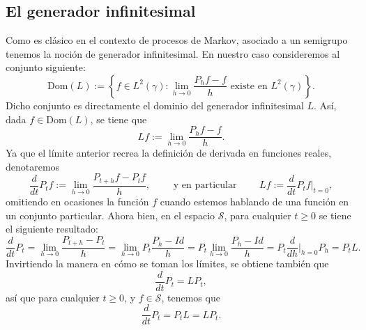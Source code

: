 \documentclass[letterpaper,twoside,12pt]{book}
\renewcommand{\S}{\mathcal{S}}
\newcommand{\1}{\mathds{1}}
\renewcommand{\to}{\rightarrow}
\theoremstyle{definition}
\theoremstyle{definition}
\theoremstyle{remark}
\theoremstyle{definition}
\theoremstyle{definition}
\theoremstyle{definition}
\theoremstyle{definition}
\theoremstyle{definition}
\begin{document}
\subsection{El generador infinitesimal}
 Como es clásico en el contexto de procesos de Markov, asociado a un semigrupo tenemos la noción de generador infinitesimal. En nuestro caso consideremos al conjunto siguiente:
 \[
 \text{Dom}(L):=\left\{f\in L^2(\gamma): \lim_{h\to 0} \frac{P_{h}f-f}{h} \text{ existe en } L^{2}(\gamma)\right\}.
 \]  
Dicho conjunto es directamente el dominio del generador infinitesimal $L$. Así, dada $f\in \text{Dom}(L)$, se tiene que 
\[
Lf:=\lim_{h\to 0}\frac{P_hf-f}{h}.    
\]
Ya que el límite anterior recrea la definición de derivada en funciones reales, denotaremos
\[
   \frac{d}{dt}P_tf:=\lim_{h\to0}\frac{P_{t+h}f-P_tf}{h}, \qquad \text{ y en particular } \qquad  Lf:=\frac{d}{dt}P_tf\bigg|_{t=0},
\]
omitiendo en ocasiones la función $f$ cuando estemos hablando de una función en un conjunto particular. Ahora bien, en el espacio $\S$, para cualquier $t\geq0$ se tiene el siguiente resultado:
\[
\frac{d}{dt}P_t=\lim_{h\to0}\frac{P_{t+h}-P_t}{h}=\lim_{h\to0}P_t\frac{P_h-Id}{h}=P_t\lim_{h\to0}\frac{P_h-Id}{h}=P_t\frac{d}{dh}\bigg|_{h=0}P_h=P_tL.
\]
Invirtiendo la manera en cómo se toman los límites, se obtiene también que
\[
\frac{d}{dt}P_t=LP_t,  
\]
así que para cualquier $t\geq0$, y $f\in \S$, tenemos que 
\[
\frac{d}{dt}P_t=P_tL=LP_t.
\]
\end{document}
